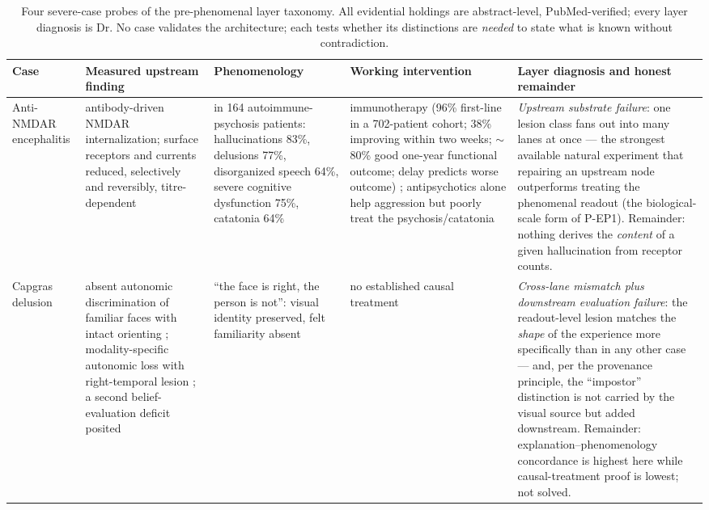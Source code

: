 \documentclass[9pt,twocolumn]{article}
\begin{document}
\begin{table}[!t]
\centering
\caption{Four severe-case probes of the pre-phenomenal layer taxonomy. All evidential holdings are abstract-level, PubMed-verified; every layer diagnosis is Dr. No case validates the architecture; each tests whether its distinctions are \emph{needed} to state what is known without contradiction.}
\label{tab:probes}
\small
\begin{tabularx}{\textwidth}{p{}p{}p{}p{}X}
\toprule
\textbf{Case} & \textbf{Measured upstream finding} & \textbf{Phenomenology} & \textbf{Working intervention} & \textbf{Layer diagnosis and honest remainder} \\
\midrule
Anti-NMDAR encephalitis & antibody-driven NMDAR internalization; surface receptors and currents reduced, selectively and reversibly, titre-dependent \cite{hughes2010} & in 164 autoimmune-psychosis patients: hallucinations 83\%, delusions 77\%, disorganized speech 64\%, severe cognitive dysfunction 75\%, catatonia 64\% \cite{guasp2025} & immunotherapy (96\% first-line in a 702-patient cohort; 38\% improving within two weeks; $\sim$80\% good one-year functional outcome; delay predicts worse outcome) \cite{neos2026}; antipsychotics alone help aggression but poorly treat the psychosis/catatonia \cite{sarkis2021} & \emph{Upstream substrate failure}: one lesion class fans out into many lanes at once --- the strongest available natural experiment that repairing an upstream node outperforms treating the phenomenal readout (the biological-scale form of P-EP1). Remainder: nothing derives the \emph{content} of a given hallucination from receptor counts. \\
Capgras delusion & absent autonomic discrimination of familiar faces with intact orienting \cite{ellis1997}; modality-specific autonomic loss with right-temporal lesion \cite{bobes2020}; a second belief-evaluation deficit posited \cite{coltheart2022} & ``the face is right, the person is not'': visual identity preserved, felt familiarity absent & no established causal treatment & \emph{Cross-lane mismatch plus downstream evaluation failure}: the readout-level lesion matches the \emph{shape} of the experience more specifically than in any other case --- and, per the provenance principle, the ``impostor'' distinction is not carried by the visual source but added downstream. Remainder: explanation--phenomenology concordance is highest here while causal-treatment proof is lowest; not solved. \\

\end{tabularx}
\end{table}
\end{document}
